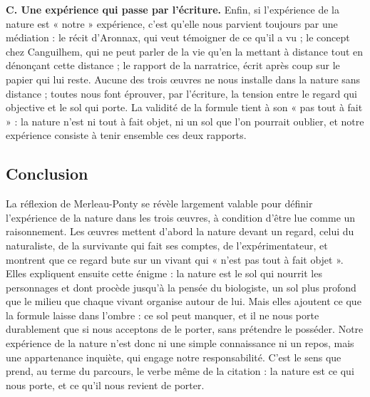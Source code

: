 \documentclass[11pt,a4paper]{article}
\begin{document}
\textbf{C. Une expérience qui passe par l'écriture.} Enfin, si l'expérience de la nature est « notre » expérience, c'est qu'elle nous parvient toujours par une médiation : le récit d'Aronnax, qui veut témoigner de ce qu'il a vu ; le concept chez Canguilhem, qui ne peut parler de la vie qu'en la mettant à distance tout en dénonçant cette distance ; le rapport de la narratrice, écrit après coup sur le papier qui lui reste. Aucune des trois œuvres ne nous installe dans la nature sans distance ; toutes nous font éprouver, par l'écriture, la tension entre le regard qui objective et le sol qui porte. La validité de la formule tient à son « pas tout à fait » : la nature n'est ni tout à fait objet, ni un sol que l'on pourrait oublier, et notre expérience consiste à tenir ensemble ces deux rapports.

\hypertarget{conclusion}{%
\subsection{Conclusion}\label{conclusion}}

La réflexion de Merleau-Ponty se révèle largement valable pour définir l'expérience de la nature dans les trois œuvres, à condition d'être lue comme un raisonnement. Les œuvres mettent d'abord la nature devant un regard, celui du naturaliste, de la survivante qui fait ses comptes, de l'expérimentateur, et montrent que ce regard bute sur un vivant qui « n'est pas tout à fait objet ». Elles expliquent ensuite cette énigme : la nature est le sol qui nourrit les personnages et dont procède jusqu'à la pensée du biologiste, un sol plus profond que le milieu que chaque vivant organise autour de lui. Mais elles ajoutent ce que la formule laisse dans l'ombre : ce sol peut manquer, et il ne nous porte durablement que si nous acceptons de le porter, sans prétendre le posséder. Notre expérience de la nature n'est donc ni une simple connaissance ni un repos, mais une appartenance inquiète, qui engage notre responsabilité. C'est le sens que prend, au terme du parcours, le verbe même de la citation : la nature est ce qui nous porte, et ce qu'il nous revient de porter.
\end{document}
